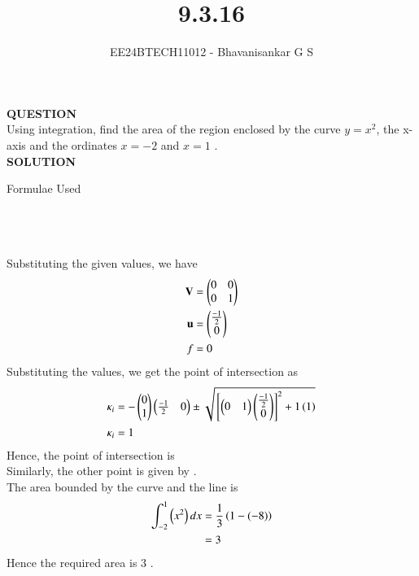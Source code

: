 \documentclass[journal]{IEEEtran}
\begin{document}

\vspace{3cm}

\title{9.3.16}
\author{EE24BTECH11012 - Bhavanisankar G S}
{\let\newpage\relax\maketitle}

\renewcommand{\thefigure}{\theenumi}
\renewcommand{\thetable}{\theenumi}
\setlength{\intextsep}{10pt} %


\renewcommand{\thetable}{\theenumi}

\textbf{QUESTION} \\
Using integration, find the area of the region enclosed by the curve $ y = x^2 $, the x-axis and the ordinates $ x = -2 $ and $ x = 1 $ . \\
\textbf{SOLUTION} \\

\begin{table}[h!]
	\centering
        
	\caption{Formulae Used}
	\label{tab9.3.16}
\end{table} \\ \\ \\
Substituting the given values, we have \\
\begin{align}
	\mathbf{V} &= \begin{pmatrix} 0 & 0 \\ 0 & 1 \end{pmatrix} \\
	\mathbf{u} &= \begin{pmatrix} \frac{-1}{2} \\ 0 \end{pmatrix} \\
	f &= 0 \\
\end{align}
Substituting the values, we get the point of intersection as \\
\begin{align}
	\kappa_i &= -\begin{pmatrix}0 \\ 1\end{pmatrix}\begin{pmatrix}\frac{-1}{2} & 0\end{pmatrix} \pm \sqrt{{}\left[\begin{pmatrix}0 & 1\end{pmatrix}\begin{pmatrix} \frac{-1}{2} \\ 0\end{pmatrix} \right]^2 + 1\left(1\right)} \\
	\kappa_i &= 1 \\
\end{align}
Hence, the point of intersection is  \\
Similarly, the other point is given by  .\\
The area bounded by the curve and the line is \\
\begin{align}
	\int_{-2}^{1} \left(x^2\right) dx &= \frac{1}{3}\left( 1 - (-8) \right) \\
	&= 3 \\
\end{align}
Hence the required area is $3$ .
	
\end{document}
